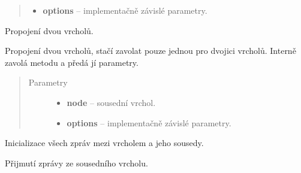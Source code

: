 \begin{fulllineitems}
\begin{fulllineitems}
\begin{quote}
\begin{description}
\begin{itemize}
\item {} 
\textbf{options} -- implementačně závislé parametry.

\end{itemize}

\end{description}\end{quote}

\end{fulllineitems}


\begin{fulllineitems}
\label{alex.infer:alex.infer.factor.alex.infer.node.Node.connect}
Propojení dvou vrcholů.

Propojení dvou vrcholů, stačí zavolat pouze jednou pro dvojici vrcholů.
Interně zavolá metodu {\hyperref[alex.infer:alex.infer.factor.alex.infer.node.Node.add_neighbor]{}} a předá jí parametry.
\begin{quote}\begin{description}
\item[{Parametry}] \leavevmode\begin{itemize}
\item {} 
\textbf{node} -- sousední vrchol.

\item {} 
\textbf{options} -- implementačně závislé parametry.

\end{itemize}

\end{description}\end{quote}

\end{fulllineitems}


\begin{fulllineitems}
\label{alex.infer:alex.infer.factor.alex.infer.node.Node.init_messages}
Inicializace všech zpráv mezi vrcholem a jeho sousedy.

\end{fulllineitems}


\begin{fulllineitems}
\label{alex.infer:alex.infer.factor.alex.infer.node.Node.message_from}
Přijmutí zprávy ze sousedního vrcholu.


\end{fulllineitems}
\end{fulllineitems}
